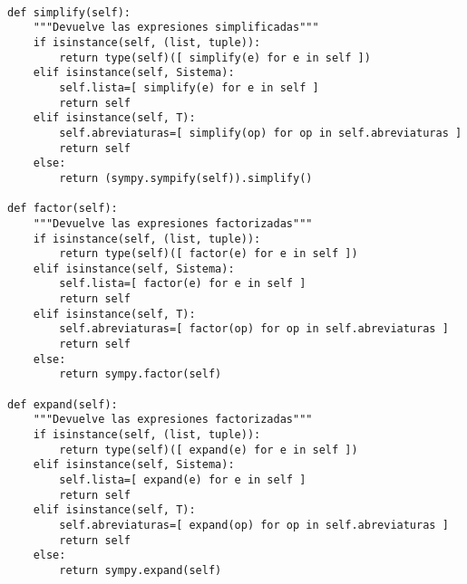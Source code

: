 \documentclass[11pt]{report}
\begin{document}
\begin{verbatim}

def simplify(self):
    """Devuelve las expresiones simplificadas"""
    if isinstance(self, (list, tuple)):
        return type(self)([ simplify(e) for e in self ])
    elif isinstance(self, Sistema):
        self.lista=[ simplify(e) for e in self ]
        return self
    elif isinstance(self, T):
        self.abreviaturas=[ simplify(op) for op in self.abreviaturas ]
        return self
    else:
        return (sympy.sympify(self)).simplify()
    
def factor(self):
    """Devuelve las expresiones factorizadas"""
    if isinstance(self, (list, tuple)):
        return type(self)([ factor(e) for e in self ])
    elif isinstance(self, Sistema):
        self.lista=[ factor(e) for e in self ]
        return self
    elif isinstance(self, T):
        self.abreviaturas=[ factor(op) for op in self.abreviaturas ]
        return self
    else:
        return sympy.factor(self)

def expand(self):
    """Devuelve las expresiones factorizadas"""
    if isinstance(self, (list, tuple)):
        return type(self)([ expand(e) for e in self ])
    elif isinstance(self, Sistema):
        self.lista=[ expand(e) for e in self ]
        return self
    elif isinstance(self, T):
        self.abreviaturas=[ expand(op) for op in self.abreviaturas ]
        return self
    else:
        return sympy.expand(self)

\end{verbatim}
\end{document}
